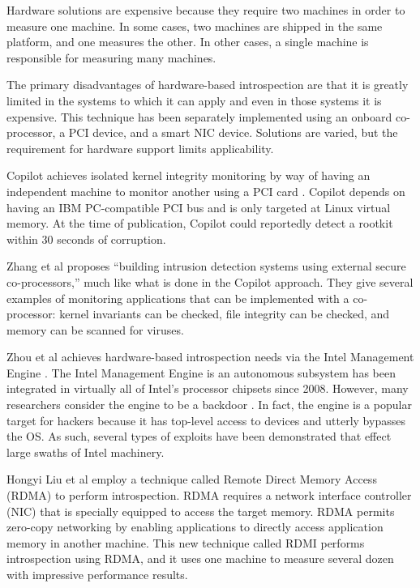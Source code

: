 \documentclass[a4paper,twoside]{article}
\begin{document}
Hardware solutions are expensive because they require two machines in order to measure one machine. In some cases, two machines are shipped in the same platform, and one measures the other. In other cases, a single machine is responsible for measuring many machines.

The primary disadvantages of hardware-based introspection are that it is greatly limited in the systems to which it can apply and even in those systems it is expensive. This technique has been separately implemented using an onboard co-processor, a PCI device, and a smart NIC device. Solutions are varied, but the requirement for hardware support limits applicability.

Copilot achieves isolated kernel integrity monitoring by way of having an independent machine to monitor another using a PCI card \cite{Copilot}. Copilot depends on having an IBM PC-compatible PCI bus and is only targeted at Linux virtual memory. At the time of publication, Copilot could reportedly detect a rootkit within 30 seconds of corruption.

Zhang et al \cite{SecDet} proposes ``building intrusion detection systems using external secure co-processors,'' much like what is done in the Copilot approach. They give several examples of monitoring applications that can be implemented with a co-processor: kernel invariants can be checked, file integrity can be checked, and memory can be scanned for viruses.

Zhou et al achieves hardware-based introspection needs via the Intel Management Engine \cite{IMEIntrospection}. The Intel Management Engine is an autonomous subsystem has been integrated in virtually all of Intel's processor chipsets since 2008. However, many researchers consider the engine to be a backdoor \cite{IME}. In fact, the engine is a popular target for hackers because it has top-level access to devices and utterly bypasses the OS. As such, several types of exploits have been demonstrated that effect large swaths of Intel machinery. 

Hongyi Liu et al employ a technique called Remote Direct Memory Access (RDMA) to perform introspection\cite{RDMI}. RDMA requires a network interface controller (NIC) that is specially equipped to access the target memory. RDMA permits zero-copy networking by enabling applications to directly access application memory in another machine. This new technique called RDMI performs introspection using RDMA, and it uses one machine to measure several dozen with impressive performance results.
\end{document}
